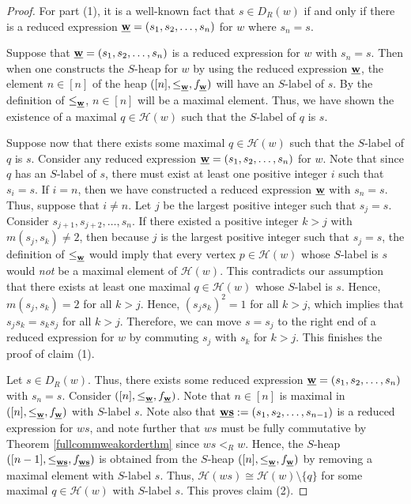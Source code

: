 \documentclass{amsart}
\theoremstyle{plain} %
\theoremstyle{definition}
\def\sweakr{<_{R}}
\def\H#1{\mathcal{H}(#1)}
\begin{document}
\begin{proof}
    For part (1), it is a well-known fact that $ s\in D_{R}(w)$ if and only if there is a reduced expression $ \textbf{\underline{w}} = (s_{1}, s_{2} , \dots , s_{n})$ for $w$ where $ s_{n} =s$. 
    
    Suppose that $ \textbf{\underline{w}} = (s_{1}, s_{2} , \dots , s_{n})$ is a reduced expression for $ w$ with $ s_{n} = s$. Then when one constructs the $S$-heap for $w$ by using the reduced expression $ \textbf{\underline{w}}$, the element $ n\in [n]$ of the heap $ ([n], \leq_{\textbf{\underline{w}}}, f_{\textbf{\underline{w}}})$ will have an $ S$-label of $ s$. By the definition of $ \leq_{\textbf{\underline{w}}}$, $ n \in [n]$ will be a maximal element. Thus, we have shown the existence of a maximal $ q\in \H{w}$ such that the $S$-label of $ q$ is $s$.  

    Suppose now that there exists some maximal $ q\in \H{w}$ such that the $ S$-label of $ q$ is $ s$. Consider any reduced expression $ \textbf{\underline{w}} = (s_{1}, s_{2}, \dots , s_{n})$ for $ w$. Note that since $ q$ has an $S$-label of $ s$, there must exist at least one positive integer $i$ such that $ s_{i} = s$. If $ i=n$, then we have constructed a reduced expression $\textbf{\underline{w}}$ with $ s_{n} = s$. Thus, suppose that $ i \neq n$. Let $ j$ be the largest positive integer such that $ s_{j} = s$. Consider $ s_{j+1}, s_{j+2}, \dots , s_{n}$. If there existed a positive integer $ k >j$ with $ m(s_{j} , s_{k}) \neq 2$, then because $ j$ is the largest positive integer such that $ s_{j} = s$, the definition of $ \leq_{\textbf{\underline{w}}}$ would imply that every vertex $ p \in \H{w}$ whose $S$-label is $ s$ would \emph{not} be a maximal element of $ \H{w}$. This contradicts our assumption that there exists at least one maximal $ q\in \H{w}$ whose $S$-label is $s$. Hence, $ m(s_{j}, s_{k}) = 2$ for all $ k > j$. Hence, $ (s_{j}s_{k})^{2} = 1$ for all $ k> j$, which implies that $ s_{j}s_{k} = s_{k}s_{j}$ for all $k> j$. Therefore, we can move $ s = s_{j}$ to the right end of a reduced expression for $ w$ by commuting $ s_{j}$ with $ s_{k}$ for $ k > j$. This finishes the proof of claim (1).

    Let $ s \in D_{R}(w)$. Thus, there exists some reduced expression $ \textbf{\underline{w}} = (s_{1}, s_{2} , \dots , s_{n})$ with $ s_{n}= s$. Consider $ ([n], \leq_{\textbf{\underline{w}}}, f_{\textbf{\underline{w}}})$. Note that $ n\in [n]$ is maximal in $([n], \leq_{\textbf{\underline{w}}}, f_{\textbf{\underline{w}}}) $ with $ S$-label $s$. Note also that $ \textbf{\underline{ws}} : = (s_{1}, s_{2} , \dots , s_{n-1})$ is a reduced expression for $ ws$, and note further that $ ws$ must be fully commutative by Theorem \ref{fullcommweakorderthm} since $ ws \sweakr w$. Hence, the $ S$-heap $([n-1], \leq_{\textbf{\underline{ws}}}, f_{\textbf{\underline{ws}}})$ is obtained from the $ S$-heap $([n], \leq_{\textbf{\underline{w}}}, f_{\textbf{\underline{w}}}) $ by removing a maximal element with $ S$-label $s$. Thus, $ \H{ws}\cong \H{w} \setminus \{ q \}$ for some maximal $ q\in \H{w}$ with $ S$-label $s$. This proves claim (2).


\end{proof}
\end{document}
